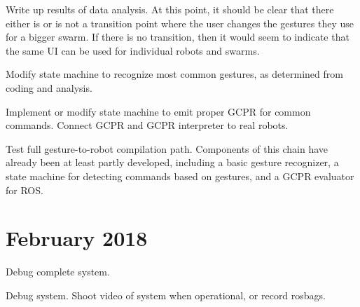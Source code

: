 Write up results of data analysis.
At this point, it should be clear that there either is or is not a transition point where the user changes the gestures they use for a bigger swarm. 
If there is no transition, then it would seem to indicate that the same UI can be used for individual robots and swarms. 


Modify state machine to recognize most common gestures, as determined from coding and analysis. 


Implement or modify state machine to emit proper GCPR for common commands. 
Connect GCPR and GCPR interpreter to real robots.
 

Test full gesture-to-robot compilation path. Components of this chain have already been at least partly developed, including a basic gesture recognizer, a state machine for detecting commands based on gestures, and a GCPR evaluator for ROS.

\section{February 2018}


Debug complete system. 


Debug system. 
Shoot video of system when operational, or record rosbags. 


